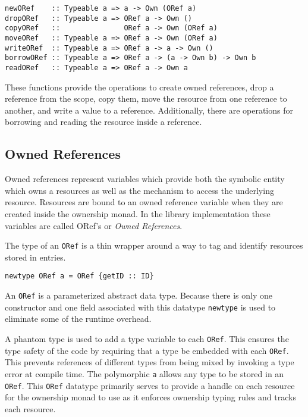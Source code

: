 \documentclass[onehalf,11pt]{beavtex}
\begin{document}
\begin{verbatim}
newORef    :: Typeable a => a -> Own (ORef a)
dropORef   :: Typeable a => ORef a -> Own ()
copyORef   ::               ORef a -> Own (ORef a)
moveORef   :: Typeable a => ORef a -> Own (ORef a)
writeORef  :: Typeable a => ORef a -> a -> Own ()
borrowORef :: Typeable a => ORef a -> (a -> Own b) -> Own b
readORef   :: Typeable a => ORef a -> Own a
\end{verbatim}

These functions provide the operations to create owned references,
drop a reference from the scope, copy them, move the resource from one reference
to another,  and write a value to a reference.
Additionally, there are operations for borrowing and reading the resource inside
a reference.

\subsection{Owned References}

Owned references represent variables which provide both the symbolic entity
which owns a resources as well as the mechanism to access the underlying
resource.
Resources are bound to an owned reference variable when they are created inside
the ownership monad.
In the library implementation these variables are called ORef's or
\textit{Owned References}.

The type of an \texttt{ORef} is a thin wrapper around a way to tag and identify
resources stored in entries.

\begin{verbatim}
newtype ORef a = ORef {getID :: ID}
\end{verbatim}

An \texttt{ORef} is a parameterized abstract data type. Because there is only
one constructor and one field associated with this datatype
\texttt{newtype} is used to eliminate some of the runtime overhead.

A phantom type is used to add a type variable to each \texttt{ORef}. This
ensures the type safety of the code by requiring that a type be embedded
with each \texttt{ORef}.
This prevents references of different types from being mixed by invoking a
type error at compile time.
The polymorphic \texttt{a} allows any type to be stored in an \texttt{ORef}.
This \texttt{ORef} datatype primarily serves to provide a handle on each
resource for the ownership monad to use as it enforces ownership typing rules
and tracks each resource.
\end{document}
